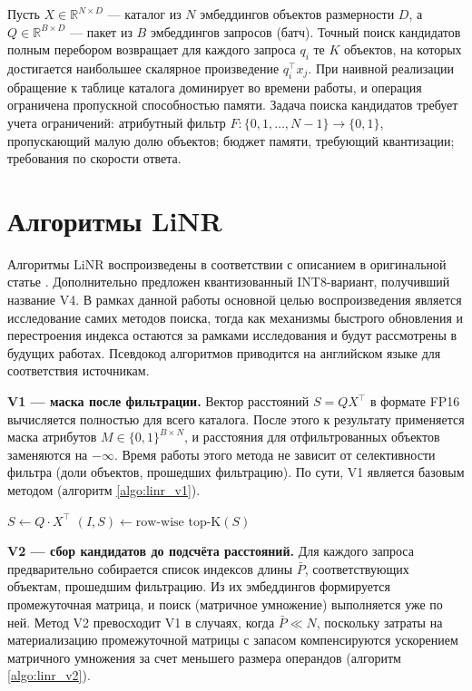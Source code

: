 \documentclass[14pt,a4paper]{extreport}
\numberwithin{figure}{chapter}
\numberwithin{table}{chapter}
\numberwithin{equation}{chapter}
\begin{document}
Пусть $X \in \mathbb{R}^{N \times D}$ --- каталог из $N$ эмбеддингов объектов размерности $D$, а 
$Q \in \mathbb{R}^{B \times D}$ --- пакет из $B$ эмбеддингов запросов (батч). Точный поиск кандидатов полным перебором возвращает 
для каждого запроса $q_i$ те $K$ объектов, на которых достигается наибольшее скалярное произведение $q_i^\top x_j$. При 
наивной реализации обращение к таблице каталога доминирует во времени работы, и операция ограничена пропускной 
способностью памяти. Задача поиска кандидатов требует учета ограничений: атрибутный фильтр 
$F : \{0, 1, \ldots, N-1\} \to \{0, 1\}$, пропускающий малую долю объектов; бюджет памяти, требующий квантизации; 
требования по скорости ответа.

\section{Алгоритмы LiNR}

Алгоритмы LiNR воспроизведены в соответствии с описанием в оригинальной статье \cite{borisyuk2024linr}. Дополнительно предложен квантизованный INT8-вариант, получивший название V4. В рамках данной работы основной целью воспроизведения является исследование самих методов поиска, тогда как механизмы быстрого обновления и перестроения индекса остаются за рамками исследования и будут рассмотрены в будущих работах. Псевдокод алгоритмов приводится на английском языке для соответствия источникам.

\textbf{V1 --- маска после фильтрации.} Вектор расстояний $S = Q X^\top$ в формате FP16 вычисляется полностью для всего каталога. После этого к результату применяется маска атрибутов $M \in \{0, 1\}^{B \times N}$, и расстояния для отфильтрованных объектов заменяются на $-\infty$. Время работы этого метода не зависит от селективности фильтра (доли объектов, прошедших фильтрацию). По сути, V1 является базовым методом (алгоритм \ref{algo:linr_v1}).

\begin{algorithm}[htbp]
\caption{LiNR V1 (постфильтрация)}
\label{algo:linr_v1}
$S \gets Q \cdot X^\top$\;
$(I, S) \gets \text{row-wise top-K}(S)$\;
\end{algorithm}

\textbf{V2 --- сбор кандидатов до подсчёта расстояний.} Для каждого запроса предварительно собирается список индексов длины $\bar{P}$, соответствующих объектам, прошедшим фильтрацию. Из их эмбеддингов формируется промежуточная матрица, и поиск (матричное умножение) выполняется уже по ней. Метод V2 превосходит V1 в случаях, когда $\bar{P} \ll N$, поскольку затраты на материализацию промежуточной матрицы с запасом компенсируются ускорением матричного умножения за счет меньшего размера операндов (алгоритм \ref{algo:linr_v2}).
\end{document}
